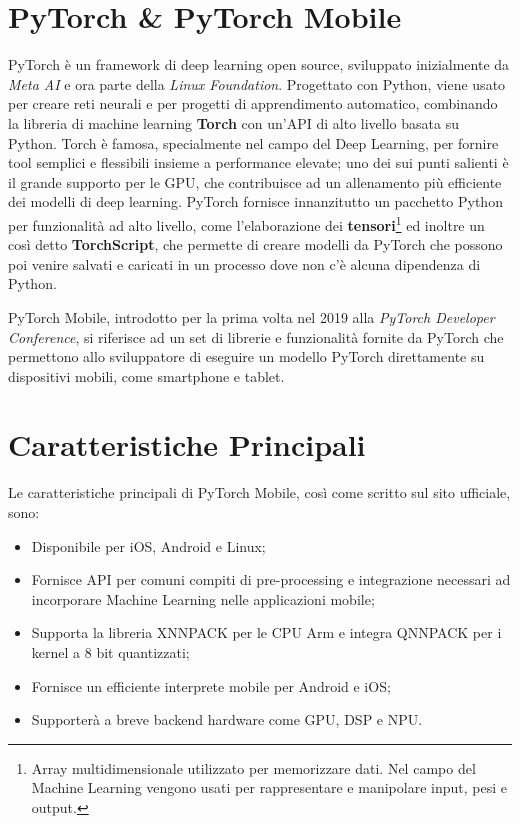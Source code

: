 \section{PyTorch \& PyTorch Mobile}
PyTorch\cite{Pytorch} è un framework di deep learning open source, sviluppato inizialmente da \textit{Meta AI} e ora parte della \textit{Linux Foundation}.
Progettato con Python, viene usato per creare reti neurali e per progetti di apprendimento automatico,
combinando la libreria di machine learning \textbf{Torch}\cite{Torch} con un’API di alto livello basata su Python. Torch è famosa, specialmente nel campo
del Deep Learning, per fornire tool semplici e flessibili insieme a performance elevate; uno dei sui punti salienti è il grande supporto per le GPU, che 
contribuisce ad un allenamento più efficiente dei modelli di deep learning.
PyTorch fornisce innanzitutto un pacchetto Python per funzionalità ad alto livello, come l'elaborazione dei \textbf{tensori}\footnote{Array multidimensionale utilizzato per memorizzare dati. Nel campo del Machine Learning vengono usati per rappresentare e manipolare input, pesi e output.}
ed inoltre un così detto \textbf{TorchScript}, che permette di creare modelli da PyTorch che possono poi venire salvati e caricati in un processo dove non c'è alcuna 
dipendenza di Python.

PyTorch Mobile\cite{PyTorchMed}, introdotto per la prima volta nel 2019 alla \textit{PyTorch Developer Conference}, si riferisce ad un set di librerie e funzionalità fornite da PyTorch che
permettono allo sviluppatore di eseguire un modello PyTorch direttamente su dispositivi mobili, come smartphone e tablet.

\section{Caratteristiche Principali}
Le caratteristiche principali di PyTorch Mobile, così come scritto sul sito ufficiale\cite{PyTorchOfficial}, sono:
\begin{itemize}
    \item Disponibile per iOS, Android e Linux;
    \item Fornisce API per comuni compiti di pre-processing e integrazione necessari ad incorporare Machine Learning nelle applicazioni mobile;
    \item Supporta la libreria XNNPACK per le CPU Arm e integra QNNPACK per i kernel a 8 bit quantizzati;
    \item Fornisce un efficiente interprete mobile per Android e iOS;
    \item Supporterà a breve backend hardware come GPU, DSP e NPU.
\end{itemize}

